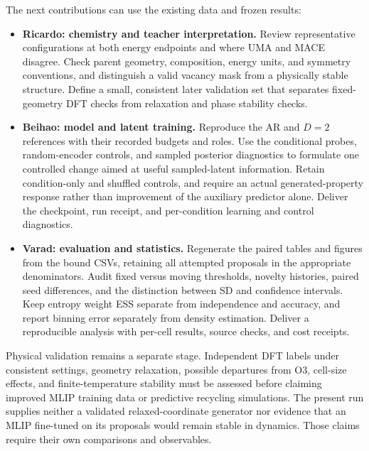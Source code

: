 The next contributions can use the existing data and frozen results:
\begin{itemize}[leftmargin=*,itemsep=4pt]
\item \textbf{Ricardo: chemistry and teacher interpretation.}
Review representative configurations at both energy endpoints and where
UMA and MACE disagree. Check parent geometry, composition, energy units,
and symmetry conventions, and distinguish a valid vacancy mask from a
physically stable structure. Define a small, consistent later validation
set that separates fixed-geometry DFT checks from relaxation and phase
stability checks.
\item \textbf{Beihao: model and latent training.}
Reproduce the AR and $D=2$ references with their recorded budgets and
roles. Use the conditional probes, random-encoder controls, and sampled
posterior diagnostics to formulate one controlled change aimed at useful
sampled-latent information. Retain condition-only and shuffled controls,
and require an actual generated-property response rather than improvement
of the auxiliary predictor alone. Deliver the checkpoint, run receipt,
and per-condition learning and control diagnostics.
\item \textbf{Varad: evaluation and statistics.}
Regenerate the paired tables and figures from the bound CSVs, retaining
all attempted proposals in the appropriate denominators. Audit fixed
versus moving thresholds, novelty histories, paired seed differences,
and the distinction between SD and confidence intervals. Keep entropy
weight ESS separate from independence and accuracy, and report binning
error separately from density estimation. Deliver a reproducible analysis
with per-cell results, source checks, and cost receipts.
\end{itemize}

Physical validation remains a separate stage. Independent DFT labels under
consistent settings, geometry relaxation, possible departures from O3,
cell-size effects, and finite-temperature stability must be assessed before
claiming improved MLIP training data or predictive recycling simulations.
The present run supplies neither a validated relaxed-coordinate generator
nor evidence that an MLIP fine-tuned on its proposals would remain stable
in dynamics. Those claims require their own comparisons and observables.
